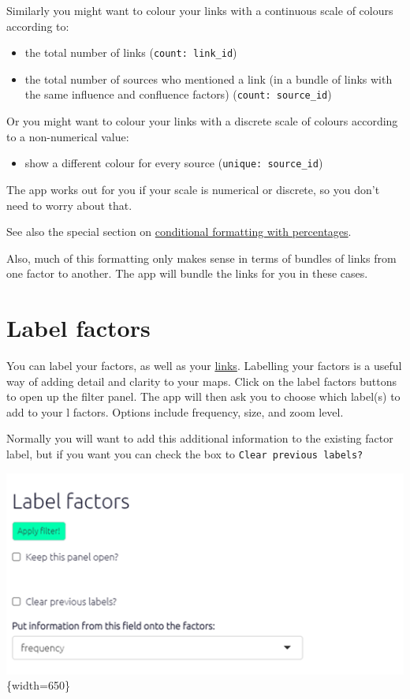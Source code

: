\documentclass[
]{book}
\providecommand{\tightlist}{%
  \setlength{\itemsep}{0pt}\setlength{\parskip}{0pt}}
\begin{document}
Similarly you might want to colour your links with a continuous scale of colours according to:

\begin{itemize}
\tightlist
\item
  the total number of links (\texttt{count:\ link\_id})
\item
  the total number of sources who mentioned a link (in a bundle of links with the same influence and confluence factors) (\texttt{count:\ source\_id})
\end{itemize}

Or you might want to colour your links with a discrete scale of colours according to a non-numerical value:

\begin{itemize}
\tightlist
\item
  show a different colour for every source (\texttt{unique:\ source\_id})
\end{itemize}

The app works out for you if your scale is numerical or discrete, so you don't need to worry about that.

See also the special section on \protect\hyperlink{percent}{conditional formatting with percentages}.

Also, much of this formatting only makes sense in terms of bundles of links from one factor to another. The app will bundle the links for you in these cases.

\hypertarget{xlabel-factors}{%
\section{Label factors}\label{xlabel-factors}}

You can label your factors, as well as your \protect\hyperlink{xformattinglinks}{links}. Labelling your factors is a useful way of adding detail and clarity to your maps. Click on the label factors buttons to open up the filter panel. The app will then ask you to choose which label(s) to add to your l factors. Options include frequency, size, and zoom level.

Normally you will want to add this additional information to the existing factor label, but if you want you can check the box to \texttt{Clear\ previous\ labels?}

\includegraphics[width=6.77083in,height=\textheight]{_assets/image-20211108160835333.png}\{width=650\}
\end{document}
